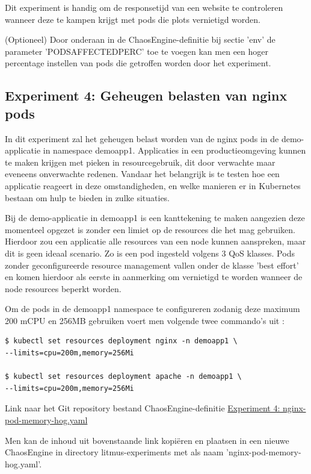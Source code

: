 Dit experiment is handig om de responsetijd van een website te controleren wanneer deze te kampen krijgt met pods die plots vernietigd worden. 

(Optioneel) Door onderaan in de ChaosEngine-definitie bij sectie 'env' de parameter 'PODS\textunderscore AFFECTED\textunderscore PERC' toe te voegen kan men een hoger percentage instellen van pods die getroffen worden door het experiment.

\subsection{Experiment 4: Geheugen belasten van nginx pods}

In dit experiment zal het geheugen belast worden van de nginx pods in de demo-applicatie in namespace demoapp1. Applicaties in een productieomgeving kunnen te maken krijgen met pieken in resourcegebruik, dit door verwachte maar eveneens onverwachte redenen. Vandaar het belangrijk is te testen hoe een applicatie reageert in deze omstandigheden, en welke manieren er in Kubernetes bestaan om hulp te bieden in zulke situaties. 

Bij de demo-applicatie in demoapp1 is een kanttekening te maken aangezien deze momenteel opgezet is zonder een limiet op de resources die het mag gebruiken. Hierdoor zou een applicatie alle resources van een node kunnen aanspreken, maar dit is geen ideaal scenario. Zo is een pod ingesteld volgens 3 QoS klasses. Pods zonder geconfigureerde resource management vallen onder de klasse 'best effort' en komen hierdoor als eerste in aanmerking om vernietigd te worden wanneer de node resources beperkt worden. \autocite{Tatiyana2020}

Om de pods in de demoapp1 namespace te configureren zodanig deze maximum 200 mCPU en 256MB gebruiken voert men volgende twee commando's uit \autocite{Kubernetes2022c}: 
\begin{lstlisting}
$ kubectl set resources deployment nginx -n demoapp1 \
--limits=cpu=200m,memory=256Mi

$ kubectl set resources deployment apache -n demoapp1 \
--limits=cpu=200m,memory=256Mi
\end{lstlisting}

Link naar het Git repository bestand ChaosEngine-definitie \href{https://github.com/KenBruggeman/BP_21-22/blob/master/bachelorproef/docs/litmus%20experimenten/nginx-pod-memory-hog.yaml}{Experiment 4: nginx-pod-memory-hog.yaml}

Men kan de inhoud uit bovenstaande link kopiëren en plaatsen in een nieuwe ChaosEngine in directory litmus-experiments met als naam 'nginx-pod-memory-hog.yaml'.

